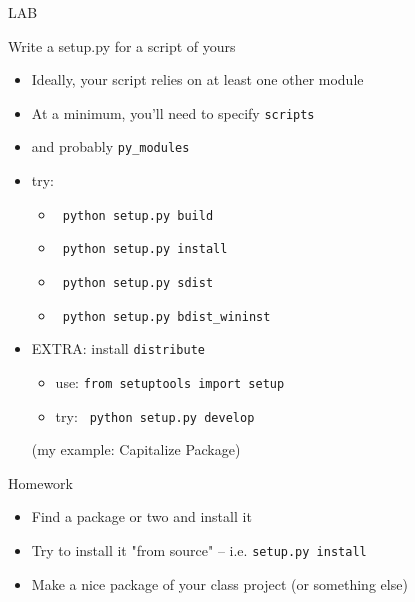 \documentclass{beamer}
\begin{document}
\begin{frame}[fragile]{LAB}

{\Large Write a setup.py for a script of yours}

\begin{itemize}
  \item Ideally, your script relies on at least one other module
  \item At a minimum, you'll need to specify \verb|scripts|
  \item and probably \verb|py_modules|
  \item try:
  \begin{itemize}
    \item \verb| python setup.py build| 
    \item \verb| python setup.py install| 
    \item \verb| python setup.py sdist| 
    \item \verb| python setup.py bdist_wininst| 
  \end{itemize}
  \item EXTRA: install \verb|distribute|
  \begin{itemize}
    \item use: \verb|from setuptools import setup|
    \item try: \verb| python setup.py develop| 
  \end{itemize}

\vfill
(my example: Capitalize Package)
\end{itemize}

\end{frame}

%
%


\begin{frame}[fragile]{Homework}

\begin{itemize}
  \item Find a package or two and install it
  \item Try to install it "from source" -- i.e. \verb|setup.py install| 
  \item Make a nice package of your class project (or something else)
\end{itemize}

\end{frame}
\end{document}
